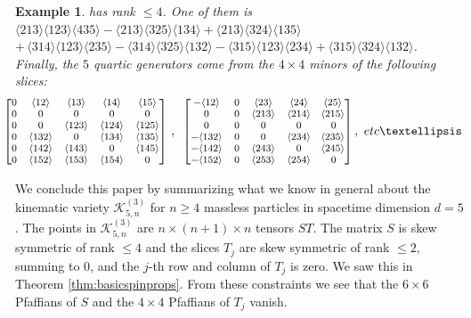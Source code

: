 \documentclass[english]{ourlematema}
\numberwithin{theorem}{section}
\newtheorem{example}[theorem]{Example}
\theoremstyle{definition}
\begin{document}
\begin{example}
has rank $\leq 4$. One of them is
              $ \langle 213 \rangle\langle 123 \rangle  \langle 435 \rangle
              -\langle 213 \rangle \langle 325 \rangle\langle 134 \rangle  +\langle 213 \rangle\langle 324 \rangle \langle 135 \rangle $ $+\,\langle 314 \rangle\langle 123 \rangle \langle 235 \rangle
            -\langle 314 \rangle \langle 325 \rangle\langle 132 \rangle 
              -\langle 315 \rangle\langle 123 \rangle \langle 234 \rangle 
+ \langle 315 \rangle\langle 324 \rangle\langle 132 \rangle$.
Finally, the $5$ quartic generators come from the $4 \times 4$ minors of the following slices:
\begin{equation}
\label{eq:specialslices2}
\begin{footnotesize} \!\!\!\!\!\!
\begin{bmatrix}
0  & \langle 12 \rangle & \langle 13 \rangle   & \langle 14 \rangle  & \langle 15 \rangle   \\
0  & 0 & 0 & 0 & 0 \\
0  & 0 & \langle 123 \rangle   & \langle 124 \rangle  & \langle 125 \rangle   \\
0  &  \langle 132 \rangle & 0  & \langle 134 \rangle  & \langle 135 \rangle   \\
0  &  \langle 142 \rangle & \langle 143 \rangle & 0   & \langle 145 \rangle   \\
0 &  \langle 152 \rangle & \langle 153 \rangle & \langle 154 \rangle & 0 \\
\end{bmatrix}  \, , \,\,\,
\begin{bmatrix}
-\langle 12 \rangle & 0 & \langle 23 \rangle   & \langle 24 \rangle  & \! \langle 25 \rangle   \\
0 & 0 & \langle 213 \rangle   & \langle 214 \rangle  & \! \langle 215 \rangle   \\
0  & 0 & 0 & 0 & 0 \\
-\langle 132 \rangle & 0  & 0 & \langle 234 \rangle  &\! \langle 235 \rangle   \\
-\langle 142 \rangle & 0 & \langle 243 \rangle & 0   &\! \langle 245 \rangle   \\ -\langle 152 \rangle & 0 & \langle 253 \rangle & \langle 254 \rangle & 0 \\
\end{bmatrix}, \,\end{footnotesize}\, {\rm etc} \ldots
\end{equation}
\end{example}

We conclude this paper by summarizing what we know in general
about the kinematic variety $\mathcal{K}^{(3)}_{5,n}$ 
for $n \geq 4$ massless particles in spacetime dimension $d=5$.
The points in    $\mathcal{K}^{(3)}_{5,n}$ 
   are $n  \times (n + 1)\times n$ tensors $ST$. 
   The matrix $S$ is skew symmetric of rank $\le 4$ and the slices $T_j$ are skew symmetric of rank $\le 2$, summing to $0$, and the $j$-th row and column of $T_j$ is zero.
   We saw this in Theorem \ref{thm:basicspinprops}.
    From these constraints we see that the $6 \times 6$ Pfaffians of $S$ and the $4 \times 4$ Pfaffians of $T_j$ vanish. 
   
\end{document}
